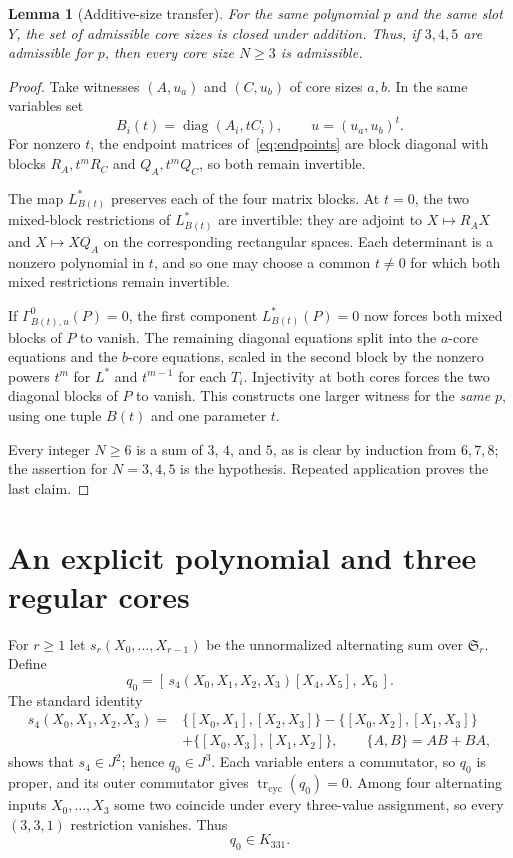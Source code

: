 \documentclass[11pt,reqno]{amsart}
\newtheorem{lemma}[theorem]{Lemma}
\theoremstyle{definition}
\newcommand{\cyc}{\operatorname{tr}_{\mathrm{cyc}}}
\newcommand{\Sym}{\mathfrak{S}}
\newcommand{\ant}[2]{\{#1,#2\}}
\begin{document}
\begin{lemma}[Additive-size transfer]\label{lem:add}
For the same polynomial $p$ and the same slot $Y$, the set of admissible core sizes is closed under addition.  Thus, if $3,4,5$ are admissible for $p$, then every core size $N\geq3$ is admissible.
\end{lemma}
\begin{proof}
Take witnesses $(A,u_a)$ and $(C,u_b)$ of core sizes $a,b$.  In the same variables set
\[
 B_i(t)=\operatorname{diag}(A_i,tC_i),\qquad u=(u_a,u_b)^t.
\]
For nonzero $t$, the endpoint matrices of~\eqref{eq:endpoints} are block diagonal with blocks $R_A,t^mR_C$ and $Q_A,t^mQ_C$, so both remain invertible.

The map $L_{B(t)}^*$ preserves each of the four matrix blocks.  At $t=0$, the two mixed-block restrictions of $L_{B(t)}^*$ are invertible: they are adjoint to $X\mapsto R_AX$ and $X\mapsto XQ_A$ on the corresponding rectangular spaces.  Each determinant is a nonzero polynomial in $t$, and so one may choose a common $t\ne0$ for which both mixed restrictions remain invertible.

If $\Gamma^0_{B(t),u}(P)=0$, the first component $L_{B(t)}^*(P)=0$ now forces both mixed blocks of $P$ to vanish.  The remaining diagonal equations split into the $a$-core equations and the $b$-core equations, scaled in the second block by the nonzero powers $t^m$ for $L^*$ and $t^{m-1}$ for each $T_i$.  Injectivity at both cores forces the two diagonal blocks of $P$ to vanish.  This constructs one larger witness for the \emph{same} $p$, using one tuple $B(t)$ and one parameter $t$.

Every integer $N\ge6$ is a sum of $3$, $4$, and $5$, as is clear by induction from $6,7,8$; the assertion for $N=3,4,5$ is the hypothesis.  Repeated application proves the last claim.
\end{proof}

\section{An explicit polynomial and three regular cores}\label{sec:cores}
For $r\geq1$ let $s_r(X_0,\ldots,X_{r-1})$ be the unnormalized alternating sum over $\Sym_r$.  Define
\begin{equation}\label{eq:q0}
 q_0=[\,s_4(X_0,X_1,X_2,X_3)[X_4,X_5],\,X_6\,].
\end{equation}
The standard identity
\begin{align*}
 s_4(X_0,X_1,X_2,X_3)={}&\ant{[X_0,X_1]}{[X_2,X_3]}
 -\ant{[X_0,X_2]}{[X_1,X_3]}\\
 &+\ant{[X_0,X_3]}{[X_1,X_2]},\qquad \{A,B\}=AB+BA,
\end{align*}
shows that $s_4\in J^2$; hence $q_0\in J^3$.  Each variable enters a commutator, so $q_0$ is proper, and its outer commutator gives $\cyc(q_0)=0$.  Among four alternating inputs $X_0,\ldots,X_3$ some two coincide under every three-value assignment, so every $(3,3,1)$ restriction vanishes.  Thus
\begin{equation}\label{eq:q0kernel}
 q_0\in K_{331}.
\end{equation}
\end{document}
